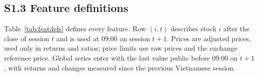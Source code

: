 {\small
\setlength{\LTpre}{0pt}
\begin{center}
\label{tab:devruns}\addtocounter{table}{-1}%
\end{center}
}


\subsection*{S1.3 Feature definitions}
Table~\ref{tab:featdefs} defines every feature. Row $(i,t)$ describes stock $i$ after the close of
session $t$ and is used at 09:00 on session $t+1$. Prices are adjusted prices, used only in returns
and ratios; price limits use raw prices and the exchange reference price. Global series enter with
the last value public before 09:00 on $t+1$, with returns and changes measured since the previous Vietnamese session.


